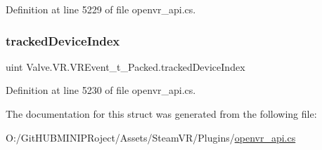 Definition at line 5229 of file openvr\+\_\+api.\+cs.

\mbox{\label{struct_valve_1_1_v_r_1_1_v_r_event__t___packed_ab8e9f8705abb3de21f2aba3d80d2e39e}} 
\subsubsection{\texorpdfstring{trackedDeviceIndex}{trackedDeviceIndex}}
{\footnotesize\ttfamily uint Valve.\+V\+R.\+V\+R\+Event\+\_\+t\+\_\+\+Packed.\+tracked\+Device\+Index}



Definition at line 5230 of file openvr\+\_\+api.\+cs.



The documentation for this struct was generated from the following file\+:\begin{DoxyCompactItemize}
\item 
O\+:/\+Git\+H\+U\+B\+M\+I\+N\+I\+P\+Roject/\+Assets/\+Steam\+V\+R/\+Plugins/\mbox{\hyperlink{openvr__api_8cs}{openvr\+\_\+api.\+cs}}\end{DoxyCompactItemize}
